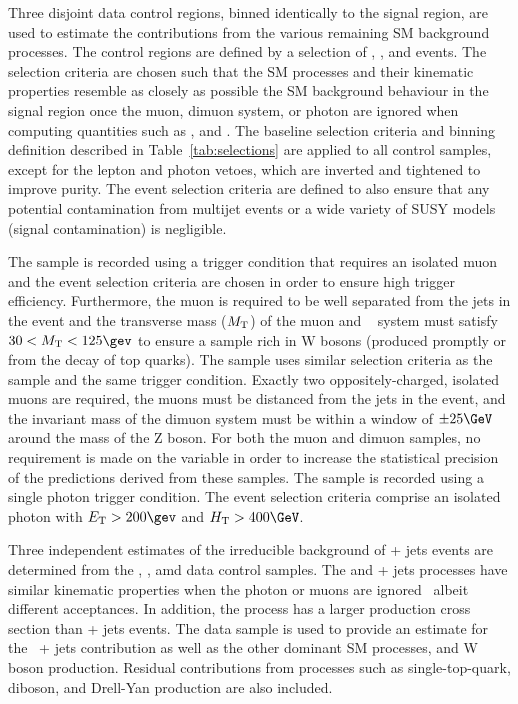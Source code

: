 Three disjoint data control regions, binned identically to the signal
region, are used to estimate the contributions from the various
remaining SM background processes. The control regions are defined by
a selection of \mj, \mmj, and \gj events. The selection criteria are
chosen such that the SM processes and their kinematic properties
resemble as closely as possible the SM background behaviour in the
signal region once the muon, dimuon system, or photon are ignored when
computing quantities such as \scalht, \mht and \alphat. The baseline
selection criteria and binning definition described in
Table~\ref{tab:selections} are applied to all control samples, except
for the lepton and photon vetoes, which are inverted and tightened to
improve purity. The event selection criteria are defined to also
ensure that any potential contamination from multijet events or a wide
variety of SUSY models (\ie signal contamination) is negligible.

The \mj sample is recorded using a trigger condition that requires an
isolated muon and the event selection criteria are chosen in order to
ensure high trigger efficiency. Furthermore, the muon is required to
be well separated from the jets in the event and the transverse mass
($M_{\rm T}$) of the muon and \ETmiss~\cite{CMS-PAS-PFT-09-001,
  CMS-PAS-PFT-10-001} system must satisfy $30 < M_{\rm T} < 125\gev$
to ensure a sample rich in W bosons (produced promptly or from the
decay of top quarks). The \mmj sample uses similar selection criteria
as the \mj sample and the same trigger condition. Exactly two
oppositely-charged, isolated muons are required, the muons must be
distanced from the jets in the event, and the invariant mass of the
dimuon system must be within a window of $\pm 25\GeV$ around the mass
of the Z boson. For both the muon and dimuon samples, no requirement
is made on the variable \alphat in order to increase the statistical
precision of the predictions derived from these samples.  The \gj
sample is recorded using a single photon trigger condition. The event
selection criteria comprise an isolated photon with $\Et > 200\gev$
and $\scalht > 400\GeV$.

Three independent estimates of the irreducible background of \znunu +
jets events are determined from the \gj, \mmj, amd \mj data control
samples. The \gj and \zmumu + jets processes have similar kinematic
properties when the photon or muons are ignored~\cite{Bern:2011pa}
albeit different acceptances. In addition, the \gj process has a
larger production cross section than \znunu + jets events. The \mj
data sample is used to provide an estimate for the \znunu\ + jets
contribution as well as the other dominant SM processes, \ttbar and W
boson production. Residual contributions from processes such as
single-top-quark, diboson, and Drell-Yan production are also included.

